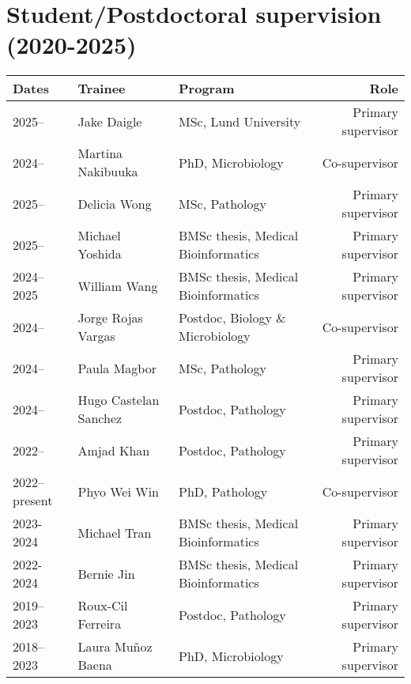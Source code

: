 
\section {Student/Postdoctoral supervision (2020-2025)}

\setlength{\tabcolsep}{6pt}
\begin{tabular}{llp{2.5in}r}
Dates & Trainee & Program & Role\\
\hline

2025-- & Jake Daigle & MSc, Lund University & Primary supervisor\\

2024-- & Martina Nakibuuka & PhD, Microbiology & Co-supervisor\\

2025-- & Delicia Wong & MSc, Pathology & Primary supervisor\\

2025-- & Michael Yoshida & BMSc thesis, Medical Bioinformatics & Primary supervisor\\

2024--2025  & William Wang & BMSc thesis, Medical Bioinformatics & Primary supervisor\\

2024-- & Jorge Rojas Vargas & Postdoc, Biology \& Microbiology & Co-supervisor\\

2024-- & Paula Magbor & MSc, Pathology & Primary supervisor\\

2024-- & Hugo Castelan Sanchez & Postdoc, Pathology & Primary supervisor\\

2022-- & Amjad Khan & Postdoc, Pathology & Primary supervisor\\

2022--present & Phyo Wei Win & PhD, Pathology & Co-supervisor\\

2023-2024 & Michael Tran & BMSc thesis, Medical Bioinformatics & Primary supervisor\\

2022-2024 & Bernie Jin & BMSc thesis, Medical Bioinformatics & Primary supervisor\\

2019--2023 & Roux-Cil Ferreira & Postdoc, Pathology & Primary supervisor\\

2018--2023 & Laura Mu\~noz Baena & PhD, Microbiology & Primary supervisor\\


\end{tabular}
